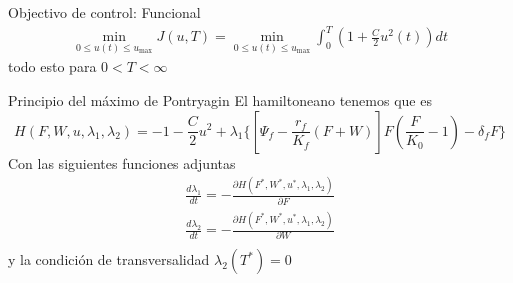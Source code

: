 \documentclass[aspectratio=169]{beamer}
\begin{document}
\begin{frame}{Objectivo de control: Funcional}
    \begin{align*}
        \min_{0\leq u(t) \leq u_{\text{max}}}J(u,T) = \min_{0\leq u(t) \leq u_{\text{max}}}\int_{0}^{T}(1+\frac{C}{2}u^2(t))dt
    \end{align*}
    todo esto para $0<T<\infty$
\end{frame}
\begin{frame}{Principio del máximo de Pontryagin}
    El hamiltoneano tenemos que es 
    \[
    H(F,W,u,\lambda_1,\lambda_2)= -1-\frac{C}{2}u^2 + \lambda_1 \{ \left[\Psi_f - \frac{r_f}{K_f}(F+W)\right] F 
                         \left(\frac{F}{K_0} - 1\right) - \delta_f F\}
    \]
    Con las siguientes funciones adjuntas
    \begin{align*}
        \frac{d \lambda_1}{dt} = -\frac{\partial H (F^*,W^*,u^*,\lambda_1,\lambda_2)}{\partial F} \\
         \frac{d \lambda_2}{dt} = -\frac{\partial H (F^*,W^*,u^*,\lambda_1,\lambda_2)}{\partial W} \\
    \end{align*}
    y la condición de transversalidad $\lambda_2(T^*)=0$
\end{frame}
\end{document}
